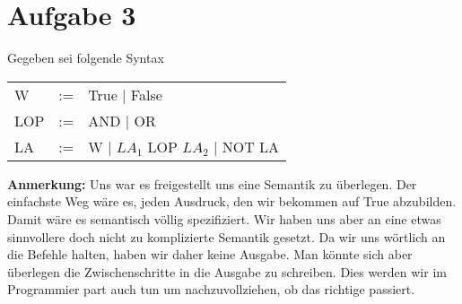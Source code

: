 \documentclass[11pt,a4paper,ngerman]{article}
\begin{document}

\section*{Aufgabe 3}

Gegeben sei folgende Syntax
\begin{tabular}{lcl}
W   & := &  True | False\\
LOP & := &  AND | OR\\
LA  & := &  W | $LA_1$ LOP $LA_2$ | NOT LA 
\end{tabular}

\textbf{Anmerkung:} Uns war es freigestellt uns eine Semantik zu überlegen.
                    Der einfachste Weg wäre es, jeden Ausdruck, den wir bekommen
                    auf True abzubilden. Damit wäre es semantisch völlig
                    spezifiziert. Wir haben uns aber an eine etwas sinnvollere
                    doch nicht zu komplizierte Semantik gesetzt. Da wir uns
                    wörtlich an die Befehle halten, haben wir daher keine Ausgabe.
                    Man könnte sich aber überlegen die Zwischenschritte in die
                    Ausgabe zu schreiben. Dies werden wir im Programmier part auch tun
                    um nachzuvollziehen, ob das richtige passiert.
\end{document}
